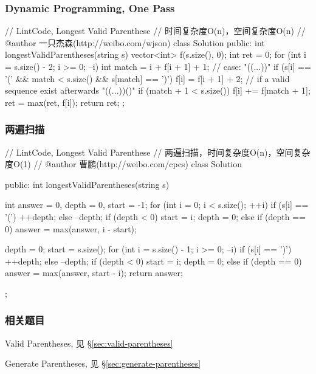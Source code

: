 \subsubsection{Dynamic Programming, One Pass}
\begin{Code}
// LintCode, Longest Valid Parenthese
// 时间复杂度O(n)，空间复杂度O(n)
// @author 一只杰森(http://weibo.com/wjson)
class Solution {
public:
    int longestValidParentheses(string s) {
        vector<int> f(s.size(), 0);
        int ret = 0;
        for (int i = s.size() - 2; i >= 0; --i) {
            int match = i + f[i + 1] + 1;
            // case: "((...))"
            if (s[i] == '(' && match < s.size() && s[match] == ')') {
                f[i] = f[i + 1] + 2;
                // if a valid sequence exist afterwards "((...))()"
                if (match + 1 < s.size()) f[i] += f[match + 1];
            }
            ret = max(ret, f[i]);
        }
        return ret;
    }
};
\end{Code}


\subsubsection{两遍扫描}
\begin{Code}
// LintCode, Longest Valid Parenthese
// 两遍扫描，时间复杂度O(n)，空间复杂度O(1)
// @author 曹鹏(http://weibo.com/cpcs)
class Solution {
public:
    int longestValidParentheses(string s) {
        int answer = 0, depth = 0, start = -1;
        for (int i = 0; i < s.size(); ++i) {
            if (s[i] == '(') {
                ++depth;
            } else {
                --depth;
                if (depth < 0) {
                    start = i;
                    depth = 0;
                } else if (depth == 0) {
                    answer = max(answer, i - start);
                }
            } 
        }

        depth = 0;
        start = s.size();
        for (int i = s.size() - 1; i >= 0; --i) {
            if (s[i] == ')') {
                ++depth;
            } else {
                --depth;
                if (depth < 0) {
                    start = i;
                    depth = 0;
                } else if (depth == 0) {
                    answer = max(answer, start - i);
                }
            } 
        }
        return answer;
    }
};
\end{Code}


\subsubsection{相关题目}
\begindot
\item Valid Parentheses, 见 \S \ref{sec:valid-parentheses}
\item Generate Parentheses, 见 \S \ref{sec:generate-parentheses}
\myenddot


